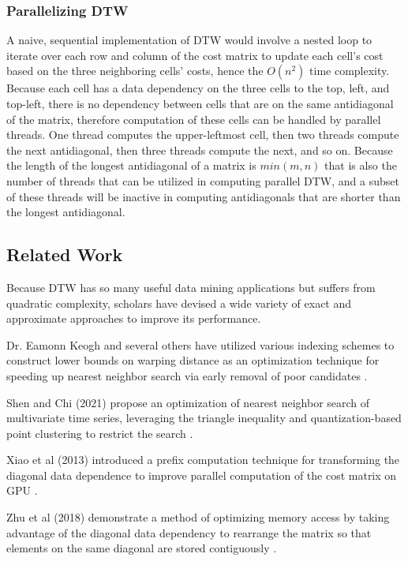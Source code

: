\documentclass[12pt, letterpaper]{article}
\begin{document}
\subsubsection{Parallelizing DTW}

A naive, sequential implementation of DTW would involve a nested loop to iterate
over each row and column of the cost matrix to update each cell's cost based on
the three neighboring cells' costs, hence the $O(n^2)$ time complexity. Because
each cell has a data dependency on the three cells to the top, left, and
top-left, there is no dependency between cells that are on the same antidiagonal
of the matrix, therefore computation of these cells can be handled by parallel
threads. One thread computes the upper-leftmost cell, then two threads compute
the next antidiagonal, then three threads compute the next, and so on. Because
the length of the longest antidiagonal of a matrix is $min(m,n)$ that is also
the number of threads that can be utilized in computing parallel DTW, and a
subset of these threads will be inactive in computing antidiagonals that are
shorter than the longest antidiagonal.

\subsection{Related Work}

Because DTW has so many useful data mining applications but suffers from
quadratic complexity, scholars have devised a wide variety of exact and
approximate approaches to improve its performance.

Dr. Eamonn Keogh and several others have utilized various indexing schemes to
construct lower bounds on warping distance as an optimization technique for
speeding up nearest neighbor search via early removal of poor candidates
\cite{keogh_exact_2002}.

Shen and Chi (2021) propose an optimization of nearest neighbor search of
multivariate time series, leveraging the triangle inequality and
quantization-based point clustering to restrict the search
\cite{shen_tc-dtw_2021}.

Xiao et al (2013) introduced a prefix computation technique for transforming the
diagonal data dependence to improve parallel computation of the cost matrix on
GPU \cite{xiao_parallelizing_2013}.

Zhu et al (2018) demonstrate a method of optimizing memory access by taking
advantage of the diagonal data dependency to rearrange the matrix so that
elements on the same diagonal are stored contiguously
\cite{zhu_developing_2018}.
\end{document}
